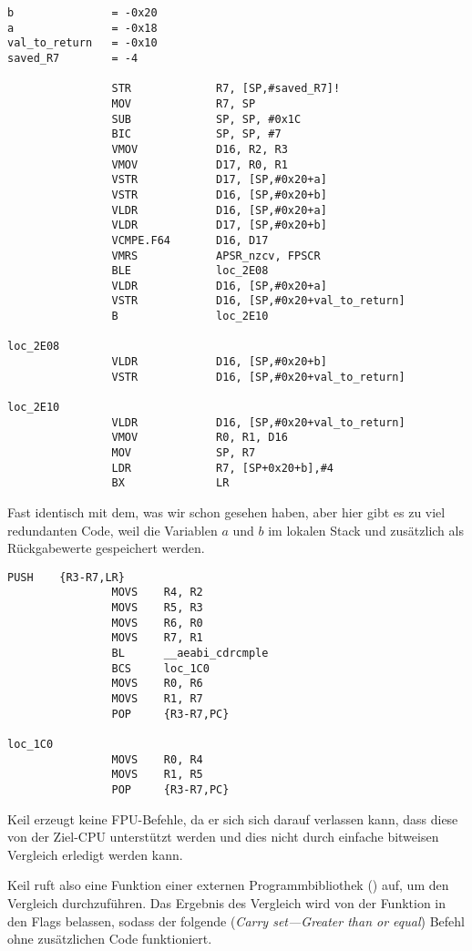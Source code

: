 \begin{lstlisting}[caption=\NonOptimizingXcodeIV (\ARMMode),style=customasmARM]
b               = -0x20
a               = -0x18
val_to_return   = -0x10
saved_R7        = -4

                STR             R7, [SP,#saved_R7]!
                MOV             R7, SP
                SUB             SP, SP, #0x1C
                BIC             SP, SP, #7
                VMOV            D16, R2, R3
                VMOV            D17, R0, R1
                VSTR            D17, [SP,#0x20+a]
                VSTR            D16, [SP,#0x20+b]
                VLDR            D16, [SP,#0x20+a]
                VLDR            D17, [SP,#0x20+b]
                VCMPE.F64       D16, D17
                VMRS            APSR_nzcv, FPSCR
                BLE             loc_2E08
                VLDR            D16, [SP,#0x20+a]
                VSTR            D16, [SP,#0x20+val_to_return]
                B               loc_2E10

loc_2E08
                VLDR            D16, [SP,#0x20+b]
                VSTR            D16, [SP,#0x20+val_to_return]

loc_2E10
                VLDR            D16, [SP,#0x20+val_to_return]
                VMOV            R0, R1, D16
                MOV             SP, R7
                LDR             R7, [SP+0x20+b],#4
                BX              LR
\end{lstlisting}
Fast identisch mit dem, was wir schon gesehen haben, aber hier gibt es zu viel redundanten Code, weil die Variablen $a$
und $b$ im lokalen Stack und zusätzlich als Rückgabewerte gespeichert werden.

\myparagraph{\OptimizingKeilVI (\ThumbMode)}

\begin{lstlisting}[caption=\OptimizingKeilVI (\ThumbMode),style=customasmARM]
                PUSH    {R3-R7,LR}
                MOVS    R4, R2
                MOVS    R5, R3
                MOVS    R6, R0
                MOVS    R7, R1
                BL      __aeabi_cdrcmple
                BCS     loc_1C0
                MOVS    R0, R6
                MOVS    R1, R7
                POP     {R3-R7,PC}

loc_1C0
                MOVS    R0, R4
                MOVS    R1, R5
                POP     {R3-R7,PC}
\end{lstlisting}

Keil erzeugt keine FPU-Befehle, da er sich sich darauf verlassen kann, dass diese von der Ziel-CPU unterstützt werden
und dies nicht durch einfache bitweisen Vergleich erledigt werden kann.

Keil ruft also eine Funktion einer externen Programmbibliothek () auf, um den Vergleich
durchzuführen.
Das Ergebnis des Vergleich wird von der Funktion in den Flags belassen, sodass der folgende  (\emph{Carry
set---Greater than or equal}) Befehl ohne zusätzlichen Code funktioniert.

